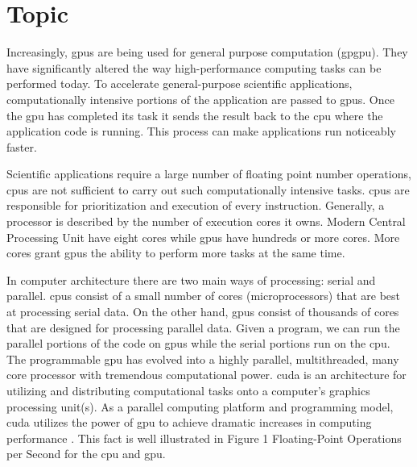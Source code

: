 \section{Topic}

Increasingly, \Glspl{gpu} are being used for general purpose computation
(\gls{gpgpu}). They have significantly altered the way high-performance
computing tasks can be performed today. To accelerate general-purpose
scientific applications, computationally intensive portions of the application
are passed to \glspl{gpu}. Once the \gls{gpu} has completed its task it sends
the result back to the \Gls{cpu} where the application code is running. This
process can make applications run noticeably faster.

Scientific applications require a large number of floating point number
operations, \Glspl{cpu} are not sufficient to carry out such computationally
intensive tasks. \glspl{cpu} are responsible for prioritization and execution
of every instruction. Generally, a processor is described by the number of
execution cores it owns. Modern Central Processing Unit have eight cores while
\Glspl{gpu} have hundreds or more cores.  More cores grant \glspl{gpu} the
ability to perform more tasks at the same time.

In computer architecture there are two main ways of processing: serial and
parallel. \Glspl{cpu} consist of a small number of cores (microprocessors) that
are best at processing serial data. On the other hand, \glspl{gpu} consist of
thousands of cores that are designed for processing parallel data. Given a
program, we can run the parallel portions of the code on \glspl{gpu} while the
serial portions run on the \gls{cpu}\@. The programmable \gls{gpu} has evolved
into a highly parallel, multithreaded, many core processor with tremendous
computational power. \Gls{cuda} is an architecture for utilizing and
distributing computational tasks onto a computer's graphics processing unit(s).
As a  parallel computing platform and programming model, \gls{cuda} utilizes
the power of \gls{gpu} to achieve dramatic increases in computing performance
\cite{website:CUDA-Toolkit-Documentation}. This fact is well illustrated in
Figure 1 Floating-Point Operations per Second for the \gls{cpu} and
\gls{gpu}.\\

